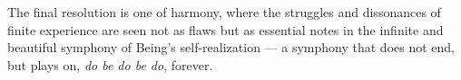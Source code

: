 The final resolution is one of harmony, where the struggles and dissonances of finite experience are seen not as flaws but as essential notes in the infinite and beautiful symphony of Being's self-realization — a symphony that does not end, but plays on, \textit{do be do be do}, forever.


\bigskip\noindent\makebox[\textwidth]{\color{rulegray}\rule{5cm}{0.3pt}}\bigskip
